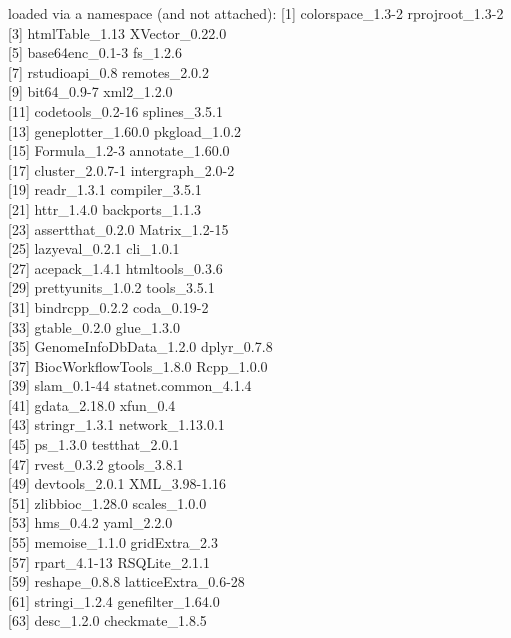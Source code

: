\documentclass[9pt,a4paper,]{extarticle}
\begin{document}
loaded via a namespace (and not attached):
{[}1{]} colorspace\_1.3-2 rprojroot\_1.3-2\\
{[}3{]} htmlTable\_1.13 XVector\_0.22.0\\
{[}5{]} base64enc\_0.1-3 fs\_1.2.6\\
{[}7{]} rstudioapi\_0.8 remotes\_2.0.2\\
{[}9{]} bit64\_0.9-7 xml2\_1.2.0\\
{[}11{]} codetools\_0.2-16 splines\_3.5.1\\
{[}13{]} geneplotter\_1.60.0 pkgload\_1.0.2\\
{[}15{]} Formula\_1.2-3 annotate\_1.60.0\\
{[}17{]} cluster\_2.0.7-1 intergraph\_2.0-2\\
{[}19{]} readr\_1.3.1 compiler\_3.5.1\\
{[}21{]} httr\_1.4.0 backports\_1.1.3\\
{[}23{]} assertthat\_0.2.0 Matrix\_1.2-15\\
{[}25{]} lazyeval\_0.2.1 cli\_1.0.1\\
{[}27{]} acepack\_1.4.1 htmltools\_0.3.6\\
{[}29{]} prettyunits\_1.0.2 tools\_3.5.1\\
{[}31{]} bindrcpp\_0.2.2 coda\_0.19-2\\
{[}33{]} gtable\_0.2.0 glue\_1.3.0\\
{[}35{]} GenomeInfoDbData\_1.2.0 dplyr\_0.7.8\\
{[}37{]} BiocWorkflowTools\_1.8.0 Rcpp\_1.0.0\\
{[}39{]} slam\_0.1-44 statnet.common\_4.1.4\\
{[}41{]} gdata\_2.18.0 xfun\_0.4\\
{[}43{]} stringr\_1.3.1 network\_1.13.0.1\\
{[}45{]} ps\_1.3.0 testthat\_2.0.1\\
{[}47{]} rvest\_0.3.2 gtools\_3.8.1\\
{[}49{]} devtools\_2.0.1 XML\_3.98-1.16\\
{[}51{]} zlibbioc\_1.28.0 scales\_1.0.0\\
{[}53{]} hms\_0.4.2 yaml\_2.2.0\\
{[}55{]} memoise\_1.1.0 gridExtra\_2.3\\
{[}57{]} rpart\_4.1-13 RSQLite\_2.1.1\\
{[}59{]} reshape\_0.8.8 latticeExtra\_0.6-28\\
{[}61{]} stringi\_1.2.4 genefilter\_1.64.0\\
{[}63{]} desc\_1.2.0 checkmate\_1.8.5\\
\end{document}
